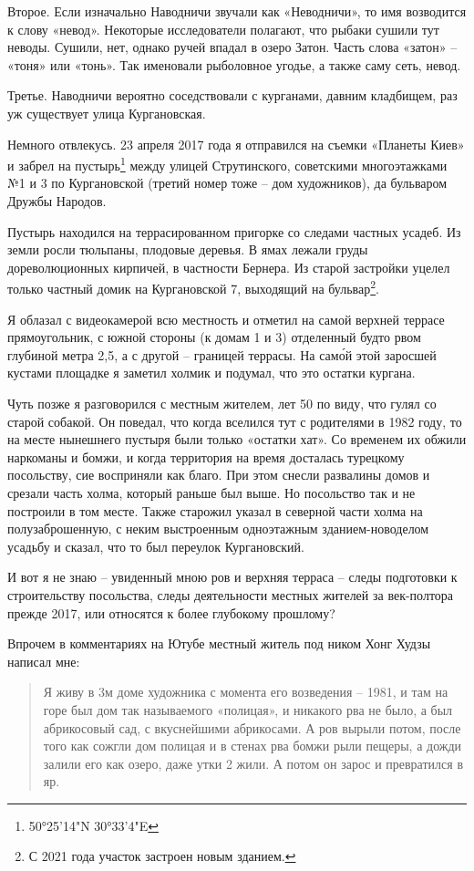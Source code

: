 Второе. Если изначально Наводничи звучали как «Не\-водничи», то имя возводится к слову «невод». Некоторые исследователи полагают, что рыбаки сушили тут неводы. Сушили, нет, однако ручей впадал в озеро Затон. Часть слова «затон» – «тоня» или «тонь». Так именовали рыболовное угодье, а также саму сеть, невод.

Третье. Наводничи вероятно соседствовали с курганами, давним кладбищем, раз уж существует улица Кургановская.

Немного отвлекусь. 23 апреля 2017 года я отправился на съемки «Планеты Киев» и забрел на пустырь\footnote{50°25'14"N 30°33'4"E} между улицей Струтинского, советскими многоэтажками №1 и 3 по Кургановской (третий номер тоже – дом художников), да бульваром Дружбы Народов.

Пустырь находился на террасированном пригорке со следами частных усадеб. Из земли росли тюльпаны, плодовые деревья. В ямах лежали груды дореволюционных кирпичей, в частности Бернера. Из старой застройки уцелел только частный домик на Кургановской 7, выходящий на бульвар\footnote{С 2021 года участок застроен новым зданием.}.

Я облазал с видеокамерой всю местность и отметил на самой верхней террасе прямоугольник, с южной стороны (к домам 1 и 3) отделенный будто рвом глубиной метра 2,5, а с другой – границей террасы. На сам\'ой этой заросшей кустами площадке я заметил холмик и подумал, что это остатки кургана.

Чуть позже я разговорился с местным жителем, лет 50 по виду, что гулял со старой собакой. Он поведал, что когда вселился тут с родителями в 1982 году, то на месте нынешнего пустыря были только «остатки хат». Со временем их обжили наркоманы и бомжи, и когда территория на время досталась турецкому посольству, сие восприняли как благо. При этом снесли развалины домов и срезали часть холма, который раньше был выше. Но посольство так и не построили в том месте. Также старожил указал в северной части холма на полузаброшенную, с неким выстроенным одноэтажным зданием-новоделом усадьбу и сказал, что то был переулок Кургановский. 

И вот я не знаю – увиденный мною ров и верхняя терраса – следы подготовки к строительству посольства, следы деятельности местных жителей за век-полтора прежде 2017, или относятся к более глубокому прошлому?

Впрочем в комментариях на Ютубе местный житель под ником Хонг Худзы написал мне:

\begin{quotation}
Я живу в 3м доме художника с момента его возведения – 1981, и там на горе был дом так называемого «полицая», и никакого рва не было, а был абрикосовый сад, с вкуснейшими абрикосами. А ров вырыли потом, после того как сожгли дом полицая и в стенах рва бомжи рыли пещеры, а дожди залили его как озеро, даже утки 2 жили. А потом он зарос и превратился в яр.
\end{quotation}

